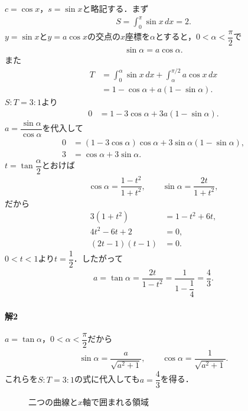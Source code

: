 \documentclass[../main.tex]{subfiles}
\begin{document}
$c=\cos x$，$s=\sin x$と略記する．まず
\begin{align}
  S=\int_0^\pi\sin x\,dx=2.
\end{align}
$y=\sin x$と$y=a\cos x$の交点の$x$座標を$\alpha$とすると，$0<\alpha<\dfrac{\pi}{2}$で
\begin{align}
  \sin\alpha=a\cos\alpha.
\end{align}
また
\begin{align}
  T&=\int_0^\alpha\sin x\,dx+\int_\alpha^{\pi/2}a\cos x\,dx\\
  &=1-\cos\alpha+a(1-\sin\alpha).
\end{align}
$S:T=3:1$より
\begin{align}
  0&=1-3\cos\alpha+3a(1-\sin\alpha).
\end{align}
$a=\dfrac{\sin\alpha}{\cos\alpha}$を代入して
\begin{align}
  0&=(1-3\cos\alpha)\cos\alpha+3\sin\alpha(1-\sin\alpha),\\
  3&=\cos\alpha+3\sin\alpha.
\end{align}
$t=\tan\dfrac{\alpha}{2}$とおけば
\begin{align}
  \cos\alpha=\dfrac{1-t^2}{1+t^2},\qquad \sin\alpha=\dfrac{2t}{1+t^2},
\end{align}
だから
\begin{align}
  3(1+t^2)&=1-t^2+6t,\\
  4t^2-6t+2&=0,\\
  (2t-1)(t-1)&=0.
\end{align}
$0<t<1$より$t=\dfrac{1}{2}$．したがって
\begin{align}
  a=\tan\alpha=\dfrac{2t}{1-t^2}=\dfrac{1}{1-\dfrac{1}{4}}=\dfrac{4}{3}.
\end{align}
\paragraph{解2}
$a=\tan\alpha$，$0<\alpha<\dfrac{\pi}{2}$だから
\begin{align}
  \sin\alpha=\dfrac{a}{\sqrt{a^2+1}},\qquad \cos\alpha=\dfrac{1}{\sqrt{a^2+1}}.
\end{align}
これらを$S:T=3:1$の式に代入しても$a=\dfrac{4}{3}$を得る．
\begin{figure}[H]
  \begin{center}
  \end{center}
  \caption{二つの曲線と$x$軸で囲まれる領域}
\end{figure}
\newpage
\end{document}
